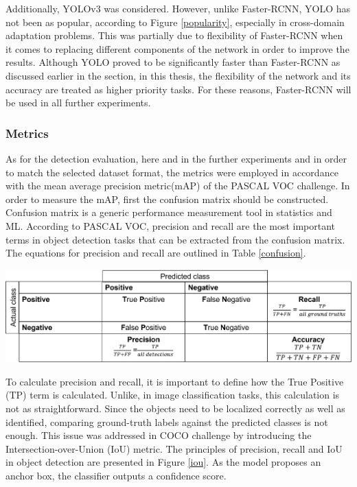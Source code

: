 Additionally, YOLOv3 \cite{Redmon2018a} was considered. However, unlike Faster-RCNN, YOLO has not been as popular, according to Figure \ref{popularity}, especially in cross-domain adaptation problems. This was partially due to flexibility of Faster-RCNN when it comes to replacing different components of the network in order to improve the results. Although YOLO proved to be significantly faster than Faster-RCNN as discussed earlier in the  section, in this thesis, the flexibility of the network and its accuracy are treated  as higher priority tasks. For these reasons, Faster-RCNN will be used in all further experiments.  
   

\subsubsection{Metrics}
\label{metrics_section} 

As for the detection evaluation, here and in the further experiments and in order to match the selected dataset format, the metrics were employed in accordance with the mean average precision metric(mAP) of the PASCAL VOC \cite{Everingham10} challenge. In order to measure the mAP, first the confusion matrix should be constructed. Confusion matrix is a generic performance measurement tool in statistics and ML. According to PASCAL VOC, precision and recall are the most important terms in object detection tasks that can be extracted from the confusion matrix. The equations for precision and recall are outlined in Table \ref{confusion}.

\begin{table}[htb]
	\begin{center}
		\includegraphics[width=14cm]{./confusion.png}
	\end{center}
	\begin{center}
		\label{confusion}
	\end{center}
\end{table}

To calculate precision and recall, it is important to define how the True Positive (TP) term is calculated. Unlike, in image classification tasks, this calculation is not as straightforward. Since the objects need to be localized correctly as well as identified, comparing ground-truth labels against the predicted classes is not enough. This issue was addressed in COCO challenge \cite{Lin2014} by introducing the Intersection-over-Union (IoU) metric. The principles of precision, recall and IoU in object detection are presented in Figure \ref{iou}. As the model proposes an anchor box, the classifier outputs a confidence score. 

